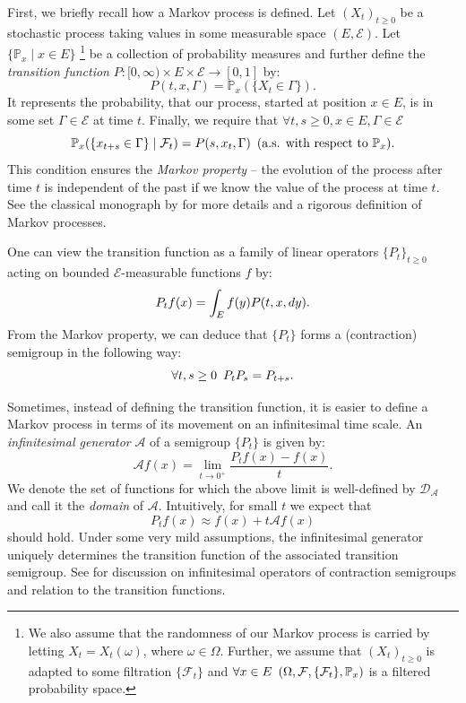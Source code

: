 \documentclass[report.tex]{subfiles}
\begin{document}
First, we briefly recall how a Markov process is defined.
Let $(X_{t})_{t \geq 0}$ be a stochastic process
taking values in some measurable space $(E, \mathcal{E})$.
Let $\{\mathbb{P}_{x} \mid x \in E \}$
\footnote{
  We also assume that the randomness of our Markov process is carried by
  letting $X_{t} = X_{t}(\omega)$, where $\omega \in \Omega$. Further, we assume
  that $(X_{t})_{t \geq 0}$ is adapted to some filtration $\{\mathcal{F}_{t}\}$
  and $\forall x\nobreak\in\nobreak E \enskip
  (\Omega, \mathcal{F}, \{\mathcal{F}_{t}\}, \mathbb{P}_{x})$
  is a filtered probability space.
}
be a collection of probability measures and further define the \textit{transition function}
\mbox{$P : \mathbb[0, \infty) \times E \times \mathcal{E} \to [0, 1]$} by:
$$P(t, x, \Gamma) = \mathbb{P}_{x}(\{X_{t} \in \Gamma\}).$$
It represents the probability, that our
process, started at position $x \in E$,
is in some set $\Gamma \in \mathcal{E}$ at time $t$.
Finally, we require that
$\forall t,s \geq 0, x \in E, \Gamma \in \mathcal{E}$
$$\mathbb{P}_{x}(\{x_{t+s} \in \Gamma\} \mid \mathcal{F}_{t}) = P(s, x_{t}, \Gamma)
  \enskip \text{(a.s. with respect to $\mathbb{P}_{x}$)}.$$
This condition ensures the \textit{Markov property} -- the evolution of the process
after time $t$ is independent of the past if we know the value of the process
at time $t$. See the classical monograph by
\citet[Chapter 3]{dynkin1965markov} for more details and a rigorous definition
of Markov processes.

One can view the transition function as a family of linear operators
$\{P_{t}\}_{t \geq 0}$ acting on bounded $\mathcal{E}$-measurable functions $f$
by:
$$P_{t}f(x) = \int_{{E}}^{{}} {f(y)P(t, x, dy)}.$$
From the Markov property, we can deduce that $\{P_{t}\}$ forms a (contraction)
semigroup in the following way:
$$\forall t,s \geq 0 \enskip P_{t}P_{s} = P_{t+s}.$$

Sometimes, instead of defining the transition function,
it is easier to define a Markov process in terms of its movement on
an infinitesimal time scale. An \textit{infinitesimal generator} $\mathcal{A}$
of a semigroup $\{P_{t}\}$ is given by:
\begin{equation}
  \label{infinitesimal-generator-definition}
  \mathcal{A}f(x) = \lim_{t \to 0^{+}} \frac{P_{t}f(x) - f(x)}{t}.
\end{equation}
We denote the set of functions for which the above limit is well-defined by
$\mathcal{D}_{\mathcal{A}}$ and call it the \textit{domain} of $\mathcal{A}$.
Intuitively, for small $t$ we expect that
$$P_{t}f(x) \approx f(x) + t\mathcal{A}f(x)$$
should hold.
Under some very
mild assumptions, the infinitesimal generator uniquely determines the
transition function of the associated transition semigroup. See
\cite[Chapters 1 and 2]{dynkin1965markov}
for discussion on infinitesimal
operators of contraction semigroups and relation to the transition functions.
\end{document}
